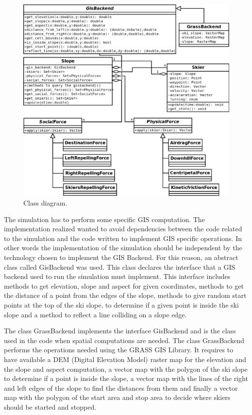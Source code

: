 \documentclass[12pt,a4paper,twoside]{book}
\begin{document}
\begin{figure}[!h]
  \begin{center}
    \includegraphics[width=\textwidth]{images/Class_diagram.eps}
    \caption{Class diagram.}\label{class_diagram}
  \end{center}
\end{figure}

The simulation has to perform some specific GIS computation. The implementation realized wanted to avoid dependencies between the code related to the simulation and the code written to implement GIS specific operations. In other words the implementation of the simulation should be independent by the technology chosen to implement the GIS Backend. For this reason, an abstract class called GisBackend was used. This class declares the interface that a GIS backend used to run the simulation must implement. This interface includes methods to get elevation, slope and aspect for given coordinates, methods to get the distance of a point from the edges of the slope, methods to give random start points at the top of the ski slope, to determine if a given point is inside the ski slope and a method to reflect a line colliding on a slope edge.

The class GrassBackend implements the interface GisBackend and is the class used in the code when spatial computations are needed. The class GrassBackend performs the operations needed using the GRASS GIS Library. It requires to have available a DEM (Digital Elevation Model) raster map for the elevation and the slope and aspect computation, a vector map with the polygon of the ski slope to determine if a point is inside the slope, a vector map with the lines of the right and left edges of the slope to find the distances from them and finally a vector map with the polygon of the start area and stop area to decide where skiers should be started and stopped.
\end{document}
